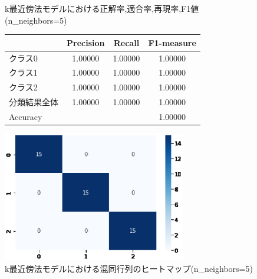 \documentclass{jarticle}     %
\makeatletter
\newcommand{\tblcaption}[1]{\def\@captype{table}\caption{#1}}
\makeatother
\begin{document}
\begin{figure}[H]
  \def\@captype{table}
  \begin{minipage}[c]{.48\textwidth}
    \tblcaption{k最近傍法モデルにおける正解率,適合率,再現率,F1値(n\_neighbors=5)}
    \label{table:k最近傍法}
    \centering
      \begin{tabular}{lccc}
        \hline
        & Precision  &  Recall &  F1-measure \\
        \hline
        クラス0  & 1.00000  & 1.00000 & 1.00000 \\
        クラス1  & 1.00000  & 1.00000 & 1.00000 \\
        クラス2  & 1.00000  & 1.00000 & 1.00000 \\
        分類結果全体  &  1.00000  &  1.00000 & 1.00000 \\
        \hline
        Accuracy & & & 1.00000\\
        \hline
      \end{tabular}
  \end{minipage}
  \hfill
  \begin{minipage}[c]{.48\textwidth}
    \includegraphics[width=80mm]{assets/kNN_heatmap.eps}
    \caption{k最近傍法モデルにおける混同行列のヒートマップ(n\_neighbors=5)}
    \label{fig:k最近傍法}
  \end{minipage}
\end{figure}






\end{document}
